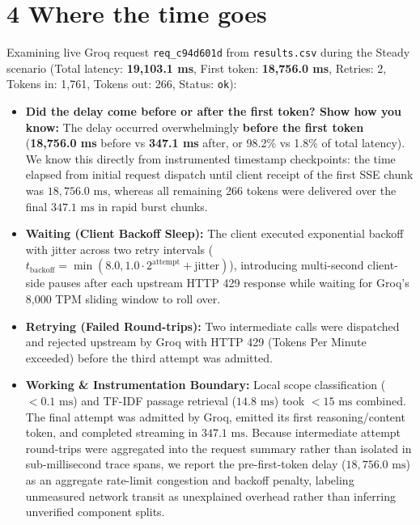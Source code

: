 \documentclass[9pt,a4paper]{article}
\begin{document}
\section*{4 Where the time goes}
Examining live Groq request \texttt{req\_c94d601d} from \texttt{results.csv} during the Steady scenario (Total latency: \textbf{19,103.1 ms}, First token: \textbf{18,756.0 ms}, Retries: 2, Tokens in: 1,761, Tokens out: 266, Status: \texttt{ok}):
\begin{itemize}
    \item \textbf{Did the delay come before or after the first token? Show how you know:}  
    The delay occurred overwhelmingly \textbf{before the first token} (\textbf{18,756.0 ms} before vs \textbf{347.1 ms} after, or 98.2\% vs 1.8\% of total latency). We know this directly from instrumented timestamp checkpoints: the time elapsed from initial request dispatch until client receipt of the first SSE chunk was $18,756.0\text{ ms}$, whereas all remaining 266 tokens were delivered over the final $347.1\text{ ms}$ in rapid burst chunks.
    \item \textbf{Waiting (Client Backoff Sleep):} The client executed exponential backoff with jitter across two retry intervals ($t_{\text{backoff}} = \min(8.0, 1.0 \cdot 2^{\text{attempt}} + \text{jitter})$), introducing multi-second client-side pauses after each upstream HTTP 429 response while waiting for Groq's 8,000 TPM sliding window to roll over.
    \item \textbf{Retrying (Failed Round-trips):} Two intermediate calls were dispatched and rejected upstream by Groq with HTTP 429 (Tokens Per Minute exceeded) before the third attempt was admitted.
    \item \textbf{Working \& Instrumentation Boundary:} Local scope classification ($<0.1\text{ ms}$) and TF-IDF passage retrieval ($14.8\text{ ms}$) took $<15\text{ ms}$ combined. The final attempt was admitted by Groq, emitted its first reasoning/content token, and completed streaming in $347.1\text{ ms}$. Because intermediate attempt round-trips were aggregated into the request summary rather than isolated in sub-millisecond trace spans, we report the pre-first-token delay ($18,756.0\text{ ms}$) as an aggregate rate-limit congestion and backoff penalty, labeling unmeasured network transit as unexplained overhead rather than inferring unverified component splits.
\end{itemize}

\newpage
\end{document}
